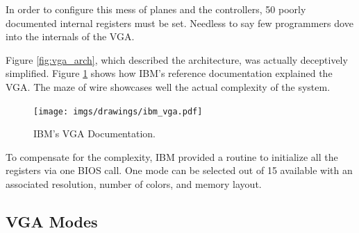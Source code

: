 \documentclass[book.tex]{subfiles}
\begin{document}
 

\par
In order to configure this mess of planes and the controllers, 50 poorly documented internal registers must be set. Needless to say few programmers dove into the internals of the VGA.\\
\par
  Figure \ref{fig:vga_arch}, which described the architecture, was actually deceptively simplified. Figure \ref{fig:ibm_vga} shows how IBM's reference documentation explained the VGA. The maze of wire showcases well the actual complexity of the system.\\
 \par
 \vspace{10pt}
 \begin{figure}[H]
\centering
\texttt{[image: imgs/drawings/ibm\_vga.pdf]}
\caption{IBM's VGA Documentation.}
\label{fig:ibm_vga}
\end{figure}

\bigskip



To compensate for the complexity, IBM provided a routine to initialize all the registers via one BIOS call. One mode can be selected out of 15 available with an associated resolution, number of colors, and memory layout.

\subsection{VGA Modes}
\end{document}
